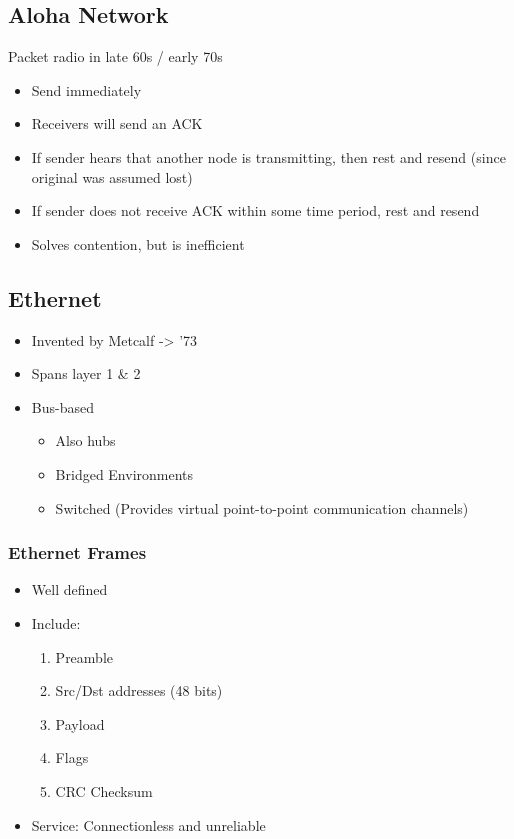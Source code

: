 \documentclass[11pt]{article}
\begin{document}
\subsection{Aloha Network}
\label{sec:orgheadline35}
Packet radio in late 60s / early 70s
\begin{itemize}
\item Send immediately
\item Receivers will send an ACK
\item If sender hears that another node is transmitting, then rest and resend
(since original was assumed lost)
\item If sender does not receive ACK within some time period, rest and resend
\item Solves contention, but is inefficient
\end{itemize}

\subsection{Ethernet}
\label{sec:orgheadline37}
\begin{itemize}
\item Invented by Metcalf -> '73
\item Spans layer 1 \& 2
\item Bus-based
\begin{itemize}
\item Also hubs
\item Bridged Environments
\item Switched (Provides virtual point-to-point communication channels)
\end{itemize}
\end{itemize}

\subsubsection{Ethernet Frames}
\label{sec:orgheadline36}
\begin{itemize}
\item Well defined
\item Include:
\begin{enumerate}
\item Preamble
\item Src/Dst addresses (48 bits)
\item Payload
\item Flags
\item CRC Checksum
\end{enumerate}
\item Service: Connectionless and unreliable
\end{itemize}
\end{document}
